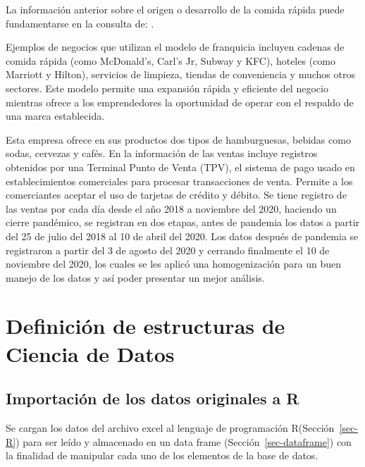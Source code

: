 \documentclass[
  us-letterpaper,
]{scrreprt}
\theoremstyle{plain}
\theoremstyle{plain}
\theoremstyle{definition}
\theoremstyle{remark}
\begin{document}
La información anterior sobre el origen o desarrollo de la comida rápida
puede fundamentarse en la consulta de: \textcite{schlosser2001fast}.

Ejemplos de negocios que utilizan el modelo de franquicia incluyen
cadenas de comida rápida (como McDonald's, Carl's Jr, Subway y KFC),
hoteles (como Marriott y Hilton), servicios de limpieza, tiendas de
conveniencia y muchos otros sectores. Este modelo permite una expansión
rápida y eficiente del negocio mientras ofrece a los emprendedores la
oportunidad de operar con el respaldo de una marca establecida.

Esta empresa ofrece en sus productos dos tipos de hamburguesas, bebidas
como sodas, cervezas y cafés. En la información de las ventas incluye
registros obtenidos por una Terminal Punto de Venta (TPV), el sistema de
pago usado en establecimientos comerciales para procesar transacciones
de venta. Permite a los comerciantes aceptar el uso de tarjetas de
crédito y débito. Se tiene registro de las ventas por cada día desde el
año 2018 a noviembre del 2020, haciendo un cierre pandémico, se
registran en dos etapas, antes de pandemia los datos a partir del 25 de
julio del 2018 al 10 de abril del 2020. Los datos después de pandemia se
registraron a partir del 3 de agosto del 2020 y cerrando finalmente el
10 de noviembre del 2020, los cuales se les aplicó una homogenización
para un buen manejo de los datos y así poder presentar un mejor
análisis.

\section{Definición de estructuras de Ciencia de
Datos}\label{definiciuxf3n-de-estructuras-de-ciencia-de-datos}

\subsection{Importación de los datos originales a
R}\label{importaciuxf3n-de-los-datos-originales-a-r}

Se cargan los datos del archivo excel al lenguaje de programación
R(Sección~\ref{sec-R}) para ser leído y almacenado en un data frame
(Sección~\ref{sec-dataframe}) con la finalidad de manipular cada uno de
los elementos de la base de datos.
\end{document}
